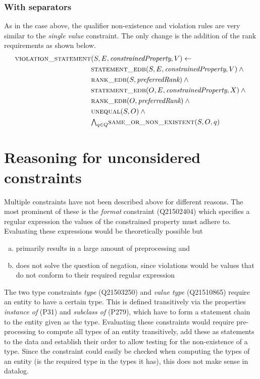 \documentclass[hyperref,bachelorofscience,fleqn]{cgvpub}
\begin{document}
\subsubsection{With separators}
As in the case above, the qualifier non-existence and violation rules are very similar to the \emph{single value} constraint. The only change is the addition of the rank requirements as shown below.
\begin{align}
\begin{split}
\textsc{violation\_statement}&(S, E, \emph{constrainedProperty}, V) \leftarrow \\
&\textsc{statement\_edb}(S, E, \emph{constrainedProperty}, V) \wedge{} \\
&\textsc{rank\_edb}(S, \emph{preferredRank}) \wedge{} \\
&\textsc{statement\_edb}(O, E, \emph{constrainedProperty}, X) \wedge{} \\
&\textsc{rank\_edb}(O, \emph{preferredRank}) \wedge{} \\
&\textsc{unequal}(S, O) \wedge{} \\
&{\textstyle\bigwedge}_{q \in Q} \textsc{same\_or\_non\_existent}(S, O, q)
\end{split}
\end{align}

\section{Reasoning for unconsidered constraints}
Multiple constraints have not been described above for different reasons. The most prominent of these is the \emph{format} constraint (Q21502404) which specifies a regular expression the values of the constrained property must adhere to. Evaluating these expressions would be theoretically possible but \\
\begin{enumerate}[a)]
\item primarily results in a large amount of preprocessing and
\item does not solve the question of negation, since violations would be values that do not conform to their required regular expression
\end{enumerate}

The two type constraints \emph{type} (Q21503250) and \emph{value type} (Q21510865) require an entity to have a certain type. This is defined transitively via the properties \emph{instance of} (P31) and \emph{subclass of} (P279), which have to form a statement chain to the entity given as the type. Evaluating these constraints would require pre-processing to compute all types of an entity transitively, add these as statements to the data and establish their order to allow testing for the non-existence of a type. Since the constraint could easily be checked when computing the types of an entity (is the required type in the types it has), this does not make sense in datalog.
\end{document}
